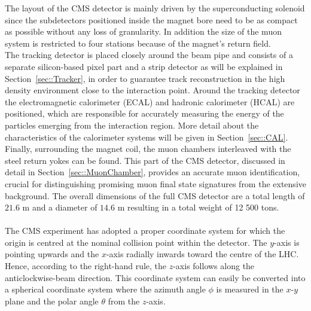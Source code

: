 The layout of the CMS detector is mainly driven by the superconducting solenoid since the subdetectors positioned inside the magnet bore need to be as compact as possible without any loss of granularity. In addition the size of the muon system is restricted to four stations because of the magnet's return field.
\\
The tracking detector is placed closely around the beam pipe and consists of a separate silicon-based pixel part and a strip detector as will be explained in Section~\ref{sec::Tracker}, in order to guarantee track reconstruction in the high density environment close to the interaction point.
Around the tracking detector the electromagnetic calorimeter (ECAL) and hadronic calorimeter (HCAL) are positioned, which are responsible for accurately measuring the energy of the particles emerging from the interaction region. More detail about the characteristics of the calorimeter systems will be given in Section~\ref{sec::CAL}. Finally, surrounding the magnet coil, the muon chambers interleaved with the steel return yokes can be found. This part of the CMS detector, discussed in detail in Section~\ref{sec::MuonChamber}, provides an accurate muon identification, crucial for distinguishing promising muon final state signatures from the extensive background. 
The overall dimensions of the full CMS detector are a total length of $21.6$ m and a diameter of $14.6$ m resulting in a total weight of 12 500 tons.
\\
\\
The CMS experiment has adopted a proper coordinate system for which the origin is centred at the nominal collision point within the detector. The $y$-axis is pointing upwards and the $x$-axis radially inwards toward the centre of the LHC. Hence, according to the right-hand rule, the $z$-axis follows along the anticlockwise-beam direction. This coordinate system can easily be converted into a spherical coordinate system where the azimuth angle $\phi$ is measured in the $x$-$y$ plane and the polar angle $\theta$ from the $z$-axis. 
